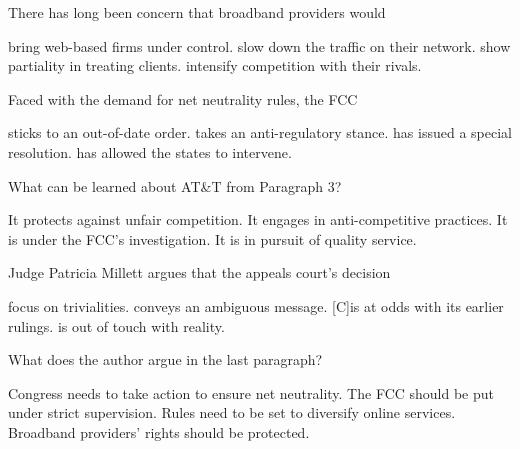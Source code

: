 \item There has long been concern that broadband providers would
\begin{tasks}
	\task bring web-based firms under control.
	\task slow down the traffic on their network.
	\task show partiality in treating clients.
	\task intensify competition with their rivals.
\end{tasks}
\item Faced with the demand for net neutrality rules, the FCC
\begin{tasks}
	\task sticks to an out-of-date order.
	\task takes an anti-regulatory stance.
	\task has issued a special resolution.
	\task has allowed the states to intervene.
\end{tasks}
\item What can be learned about AT\&T from Paragraph 3?
\begin{tasks}
	\task It protects against unfair competition.
	\task It engages in anti-competitive practices.
	\task It is under the FCC's investigation.
	\task It is in pursuit of quality service.
\end{tasks}
\item Judge Patricia Millett argues that the appeals court's decision
\begin{tasks}
	\task focus on trivialities.
	\task conveys an ambiguous message.
		[C]is at odds with its earlier rulings.
	\task is out of touch with reality.
\end{tasks}
\item What does the author argue in the last paragraph?
\begin{tasks}
	\task Congress needs to take action to ensure net neutrality.
	\task The FCC should be put under strict supervision.
	\task Rules need to be set to diversify online services.
	\task Broadband providers' rights should be protected.
\end{tasks}